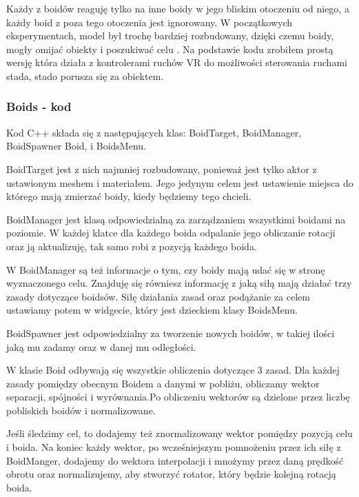 \documentclass[a4paper,12pt,reqno]{article}
\begin{document}
Każdy z boidów reaguję tylko na inne boidy w jego bliskim otoczeniu od niego, a każdy boid z poza tego otoczenia jest ignorowany. W początkowych eksperymentach, model był trochę bardziej rozbudowany, dzięki czemu boidy, mogły omijać obiekty i poszukiwać celu \cite{boids_reynolds}. Na podstawie kodu \cite{code_boids} zrobiłem prostą wersję która działa z kontrolerami ruchów VR do możliwości sterowania ruchami stada, stado porusza się za obiektem.

\subsubsection{Boids - kod}

Kod C++ składa się z następujących klas: BoidTarget, BoidManager, BoidSpawner Boid,  i BoidsMenu. 

BoidTarget jest z nich najmniej rozbudowany, ponieważ jest tylko aktor z ustawionym meshem i materiałem. Jego jedynym celem jest ustawienie miejsca do którego mają zmierzać boidy, kiedy będziemy tego chcieli.

BoidManager jest klasą odpowiedzialną za zarządzaniem wszystkimi boidami na poziomie. W każdej klatce dla każdego boida odpalanie jego obliczanie rotacji oraz ją aktualizuję, tak samo robi z pozycją każdego boida.



W BoidManager są też informacje o tym, czy boidy mają udać się w stronę wyznaczonego celu. Znajduję się równiesz informację z jaką siłą mają działać trzy zasady dotyczące boidsów. Siłę działania zasad oraz podążanie za celem ustawiamy potem w widgecie, który jest dzieckiem klasy BoidsMenu.

BoidSpawner jest odpowiedzialny za tworzenie nowych boidów, w takiej ilości jaką mu zadamy oraz w danej mu odległości.

W klasie Boid odbywają się wszystkie obliczenia dotyczące 3 zasad. Dla każdej zasady pomiędzy obecnym Boidem a danymi w pobliżu, obliczamy wektor separacji, spójności i wyrównania.Po obliczeniu wektorów są dzielone przez liczbę pobliskich boidów i normalizowane.



Jeśli śledzimy cel, to dodajemy też znormalizowany wektor pomiędzy pozycją celu i boida. Na koniec każdy wektor, po wcześniejszym pomnożeniu przez ich siłę z BoidManger, dodajemy do wektora interpolacji i mnożymy przez daną prędkość obrotu oraz normalizujemy, aby stworzyć rotator, który będzie kolejną rotacją boida.
\end{document}
